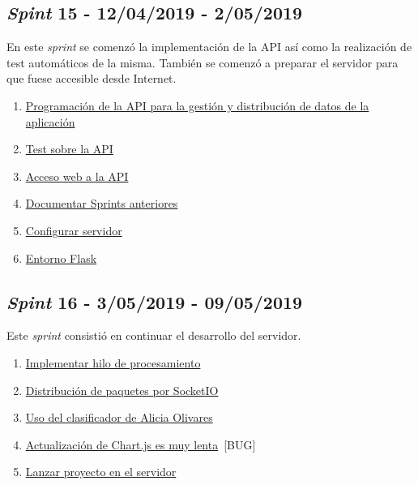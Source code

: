 \subsection{\textit{Spint} 15 - 12/04/2019 - 2/05/2019 }
En este \textit{sprint} se comenzó la implementación de la API así como la realización de test automáticos de la misma. También se comenzó a preparar el servidor para que fuese accesible desde Internet.

\begin{enumerate}\addtocounter{enumi}{67}
	\item 
	\href{https://github.com/jlgarridol/TFG-SmartBeds/issues/68}{Programación de la API para la gestión y distribución de datos de la aplicación}
	\item 
	\href{https://github.com/jlgarridol/TFG-SmartBeds/issues/69}{Test sobre la API}
	\item 
	\href{https://github.com/jlgarridol/TFG-SmartBeds/issues/70}{Acceso web a la API}
	\item 
	\href{https://github.com/jlgarridol/TFG-SmartBeds/issues/71}{Documentar Sprints anteriores}
	\item 
	\href{https://github.com/jlgarridol/TFG-SmartBeds/issues/72}{Configurar servidor}
	\item 
	\href{https://github.com/jlgarridol/TFG-SmartBeds/issues/73}{Entorno Flask}
\end{enumerate}

\subsection{\textit{Spint} 16 - 3/05/2019 - 09/05/2019}
Este \textit{sprint} consistió en continuar el desarrollo del servidor.

\begin{enumerate}\addtocounter{enumi}{73}
	\item 
	\href{https://github.com/jlgarridol/TFG-SmartBeds/issues/74}{Implementar hilo de procesamiento}
	\item 
	\href{https://github.com/jlgarridol/TFG-SmartBeds/issues/75}{Distribución de paquetes por SocketIO}
	\item 
	\href{https://github.com/jlgarridol/TFG-SmartBeds/issues/76}{Uso del clasificador de Alicia Olivares}
	\item 
	\href{https://github.com/jlgarridol/TFG-SmartBeds/issues/77}{Actualización de Chart.js es muy lenta}~[BUG]
	\item 
	\href{https://github.com/jlgarridol/TFG-SmartBeds/issues/78}{Lanzar proyecto en el servidor}
\end{enumerate}

